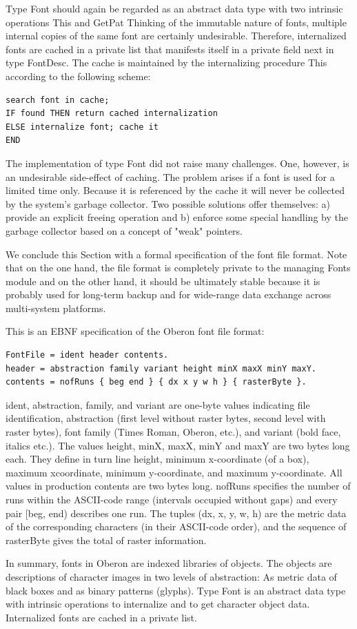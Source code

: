 Type Font should again be regarded as an abstract data type with two intrinsic operations This and
GetPat Thinking of the immutable nature of fonts, multiple internal copies of the same font are
certainly undesirable. Therefore, internalized fonts are cached in a private list that manifests itself in
a private field next in type FontDesc. The cache is maintained by the internalizing procedure This
according to the following scheme:
\begin{verbatim}
search font in cache;
IF found THEN return cached internalization
ELSE internalize font; cache it
END
\end{verbatim}
The implementation of type Font did not raise many challenges. One, however, is an undesirable
side-effect of caching. The problem arises if a font is used for a limited time only. Because it is
referenced by the cache it will never be collected by the system's garbage collector. Two possible
solutions offer themselves: a) provide an explicit freeing operation and b) enforce some special
handling by the garbage collector based on a concept of "weak" pointers.

We conclude this Section with a formal specification of the font file format. Note that on the one
hand, the file format is completely private to the managing Fonts module and on the other hand, it
should be ultimately stable because it is probably used for long-term backup and for wide-range
data exchange across multi-system platforms.

This is an EBNF specification of the Oberon font file format:
\begin{verbatim}
FontFile = ident header contents.
header = abstraction family variant height minX maxX minY maxY.
contents = nofRuns { beg end } { dx x y w h } { rasterByte }.
\end{verbatim}
ident, abstraction, family, and variant are one-byte values indicating file identification, abstraction
(first level without raster bytes, second level with raster bytes), font family (Times Roman, Oberon,
etc.), and variant (bold face, italics etc.). The values height, minX, maxX, minY and maxY are two
bytes long each. They define in turn line height, minimum x-coordinate (of a box), maximum xcoordinate, minimum y-coordinate, and maximum y-coordinate. All values in production contents are two bytes long. nofRuns specifies the number of runs within the ASCII-code range (intervals
occupied without gaps) and every pair [beg, end) describes one run. The tuples (dx, x, y, w, h) are
the metric data of the corresponding characters (in their ASCII-code order), and the sequence of
rasterByte gives the total of raster information.

In summary, fonts in Oberon are indexed libraries of objects. The objects are descriptions of
character images in two levels of abstraction: As metric data of black boxes and as binary patterns
(glyphs). Type Font is an abstract data type with intrinsic operations to internalize and to get
character object data. Internalized fonts are cached in a private list.
